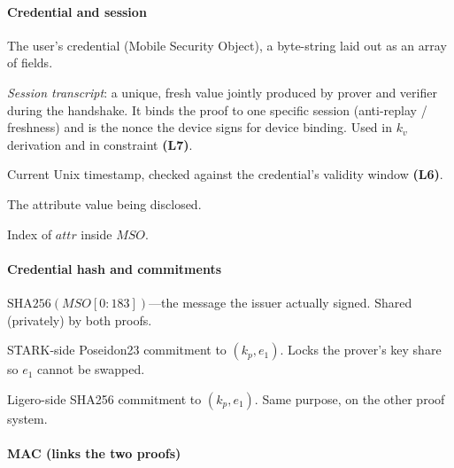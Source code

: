 \documentclass[binding=0.6cm,oneside,noexaminfo]{sapthesis}
\newcommand{\SHA}{\mathrm{SHA256}}
\begin{document}
\paragraph*{Credential and session}

\begin{description}[leftmargin=3.5em, labelwidth=3em, style=sameline, itemsep=2pt]
  \item[$MSO$]   The user's credential (Mobile Security Object), a byte-string
                 laid out as an array of fields.
  \item[$tr$]    \emph{Session transcript}: a unique, fresh value jointly produced
                 by prover and verifier during the handshake. It binds the proof to
                 one specific session (anti-replay / freshness) and is the nonce the
                 device signs for device binding. Used in $k_v$ derivation and in
                 constraint \textbf{(L7)}.
  \item[$now$]   Current Unix timestamp, checked against the credential's validity
                 window \textbf{(L6)}.
  \item[$attr$]  The attribute value being disclosed.
  \item[$id$]    Index of $attr$ inside $MSO$.
\end{description}

\paragraph*{Credential hash and commitments}

\begin{description}[leftmargin=3.5em, labelwidth=3em, style=sameline, itemsep=2pt]
  \item[$e_1$]   $\SHA(MSO[0:183])$---the message the issuer actually signed.
                 Shared (privately) by both proofs.
  \item[$R_S$]   STARK-side Poseidon23 commitment to $(k_p,e_1)$. Locks the
                 prover's key share so $e_1$ cannot be swapped.
  \item[$R_L$]   Ligero-side SHA256 commitment to $(k_p,e_1)$. Same purpose,
                 on the other proof system.
\end{description}

\paragraph*{MAC (links the two proofs)}
\end{document}
